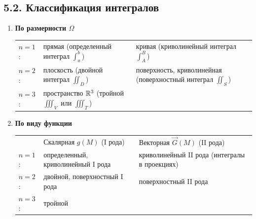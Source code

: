\documentclass[12pt]{article}
\begin{document}
    \subsection{5.2. Классификация интегралов}

    \begin{enumerate}[label*=\textbf{\arabic**} ]
        \item \textbf{По размерности $\Omega$}

        \begin{tabular}{lp{7.5cm}p{7.5cm}}
            $n = 1$: & прямая (определенный интеграл $\int_a^b$)    & кривая (криволинейный интеграл $\int_A^B$)                       \\

            $n = 2$: & плоскость (двойной интеграл $\iint_D$) & поверхность, криволинейная (поверхностный интеграл $\iint_S$) \\

            $n = 3$: & пространство $\mathbb{R}^3$ (тройной $\iiint_V$ или $\iiint_T$) & \\
            

        \end{tabular}

        \item \textbf{По виду функции}

        \begin{tabular}{lp{7.5cm}p{7.5cm}}
            & {\centering Скалярная $g(M)$ (I рода)} & {\centering Векторная $\vec{G}(M)$ (II рода)} \\

            $n = 1$: & определенный, криволинейный I рода & криволинейный II рода (интегралы в проекциях) \\

            $n = 2$: & двойной, поверхностный I рода            & поверхностный II рода                          \\

            $n = 3$: & тройной
        \end{tabular}
    \end{enumerate}
\end{document}

